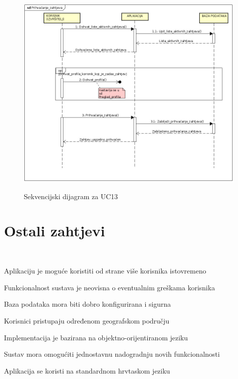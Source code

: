 \newpage
{}
\newline {}\\
\begin{figure}[H]
	\includegraphics[scale=0.48]{slike/sekvencijski_dijagram_prihavcanje_zahtjeva.jpeg} %
	\centering
	\caption \newline Sekvencijski dijagram za UC13
	\label{fig:promjene}
\end{figure}

\newpage
\section{Ostali zahtjevi}


\
\begin{packed_item}
	\item Aplikaciju je moguće koristiti od strane više korisnika istovremeno
	\item Funkcionalnost sustava je neovisna o eventualnim greškama korisnika
	\item Baza podataka mora biti dobro konfigurirana i sigurna
	\item Korisnici pristupaju određenom geografskom području
	\item Implementacija je bazirana na objektno-orijentiranom jeziku
	\item Sustav mora omogućiti jednostavnu nadogradnju novih funkcionalnosti
	\item Aplikacija se koristi na standardnom hrvtaskom jeziku

\end{packed_item}
